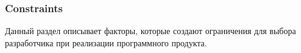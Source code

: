 \subsubsection{Constraints}

Данный раздел описывает факторы, которые создают ограничения для выбора разработчика при реализации программного продукта.







